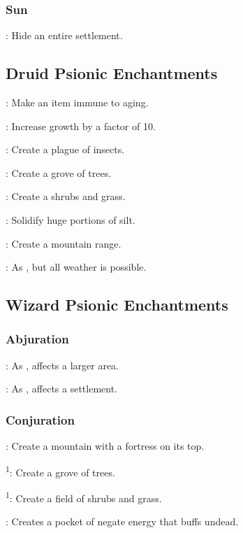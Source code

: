\subsubsection{Sun}
: Hide an entire settlement. %


\subsection{Druid Psionic Enchantments}
: Make an item immune to aging.

: Increase growth by a factor of 10.

: Create a plague of insects.

: Create a grove of trees.

: Create a shrubs and grass.

: Solidify huge portions of silt.

: Create a mountain range.

: As , but all weather is possible.



\subsection{Wizard Psionic Enchantments}
\subsubsection{Abjuration}
: As , affects a larger area.

: As , affects a settlement. %


\subsubsection{Conjuration}
: Create a mountain with a fortress on its top.

\textsuperscript{1}: Create a grove of trees.

\textsuperscript{1}: Create a field of shrubs and grass.

: Creates a pocket of negate energy that buffs undead.

